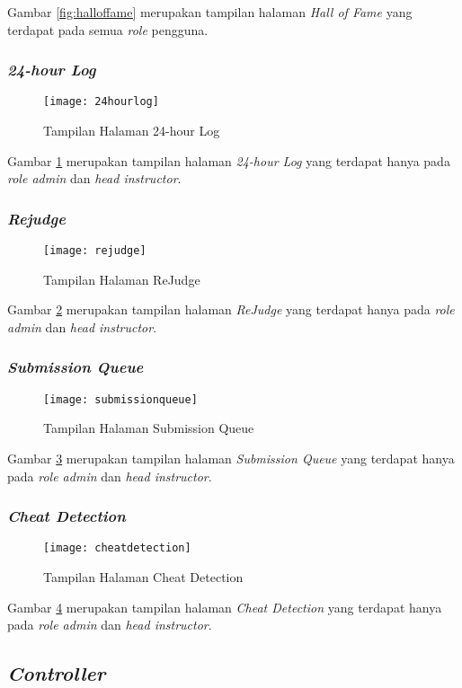 Gambar \ref{fig:halloffame} merupakan tampilan halaman \textit{Hall of Fame} yang terdapat pada semua \textit{role} pengguna.


\subsubsection{\textit{24-hour Log}}
\begin{figure}[H]
	\centering  
	\texttt{[image: 24hourlog]}  
	\caption[Tampilan Halaman \textit{24-hour Log}]{Tampilan Halaman 24-hour Log} 
	\label{fig:24hourlog} 
\end{figure}

Gambar \ref{fig:24hourlog} merupakan tampilan halaman \textit{24-hour Log} yang terdapat hanya pada \textit{role admin} dan \textit{head instructor}.

\subsubsection{\textit{Rejudge}}
\begin{figure}[H]
	\centering  
	\texttt{[image: rejudge]}  
	\caption[Tampilan Halaman \textit{ReJudge}]{Tampilan Halaman ReJudge} 
	\label{fig:rejudge} 
\end{figure}

Gambar \ref{fig:rejudge} merupakan tampilan halaman \textit{ReJudge} yang terdapat hanya pada \textit{role admin} dan \textit{head instructor}.

\subsubsection{\textit{Submission Queue}}
\begin{figure}[H]
	\centering  
	\texttt{[image: submissionqueue]}  
	\caption[Tampilan Halaman \textit{Submission Queue}]{Tampilan Halaman Submission Queue} 
	\label{fig:submissionqueue} 
\end{figure}

Gambar \ref{fig:submissionqueue} merupakan tampilan halaman \textit{Submission Queue} yang terdapat hanya pada \textit{role admin} dan \textit{head instructor}.

\subsubsection{\textit{Cheat Detection}}
\begin{figure}[H]
	\centering  
	\texttt{[image: cheatdetection]}  
	\caption[Tampilan Halaman \textit{Cheat Detection}]{Tampilan Halaman Cheat Detection} 
	\label{fig:cheatdetection} 
\end{figure}

Gambar \ref{fig:cheatdetection} merupakan tampilan halaman \textit{Cheat Detection} yang terdapat hanya pada \textit{role admin} dan \textit{head instructor}.

\subsection{\textit{Controller}}